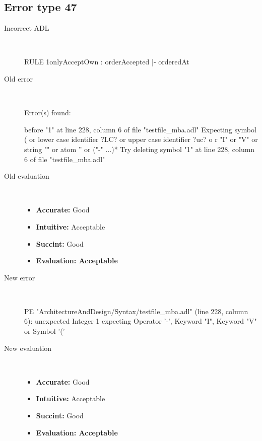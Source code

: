 \subsection{Error type 47}
  \begin{description}
  \item[Incorrect ADL]~\\
\begin{adl}
RULE 1onlyAcceptOwn : orderAccepted |- orderedAt\end{adl}
  \item[Old error]~\\
\begin{haskell}
Error(s) found:

before "1" at line 228, column 6 of file "testfile_mba.adl"
Expecting symbol ( or lower case identifier ?LC? or upper case identifier ?uc? o
r "I" or "V" or string "" or atom '' or ("-" ...)*
Try deleting symbol "1" at line 228, column 6 of file "testfile_mba.adl"
\end{haskell}
  \item[Old evaluation]~\\
    \begin{itemize}
    \item \textbf{Accurate:} Good
    \item \textbf{Intuitive:} Acceptable
    \item \textbf{Succint:} Good
    \item \textbf{Evaluation: Acceptable}
    \end{itemize}
  \item[New error]~\\
\begin{haskell}
PE "ArchitectureAndDesign/Syntax/testfile_mba.adl" (line 228, column 6):
unexpected Integer 1
expecting Operator '-', Keyword "I", Keyword "V" or Symbol '('\end{haskell}
  \item[New evaluation]~\\
    \begin{itemize}
    \item \textbf{Accurate:} Good
    \item \textbf{Intuitive:} Acceptable
    \item \textbf{Succint:} Good
    \item \textbf{Evaluation: Acceptable
}
    \end{itemize}
  \end{description}

\hrulefill

